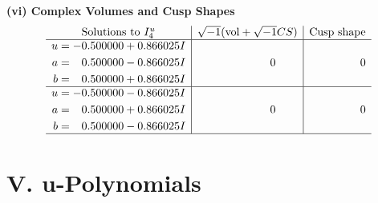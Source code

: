 \documentclass[1p]{elsarticle_modified}
\theoremstyle{definition}
\newcommand{\I}{\sqrt{-1}}
\begin{document}
\newpage\flushleft \textbf{(vi) Complex Volumes and Cusp Shapes}
$$\begin{array}{c|c|c}  
\text{Solutions to }I^u_{4}& \I (\text{vol} + \sqrt{-1}CS) & \text{Cusp shape}\\
 \hline 
\begin{aligned}
u &= -0.500000 + 0.866025 I \\
a &= \phantom{-}0.500000 - 0.866025 I \\
b &= \phantom{-}0.500000 + 0.866025 I\end{aligned}
 & \phantom{-0.000000 } 0 & \phantom{-0.000000 } 0 \\ \hline\begin{aligned}
u &= -0.500000 - 0.866025 I \\
a &= \phantom{-}0.500000 + 0.866025 I \\
b &= \phantom{-}0.500000 - 0.866025 I\end{aligned}
 & \phantom{-0.000000 } 0 & \phantom{-0.000000 } 0\\
 \hline 
 \end{array}$$\newpage
\newpage\renewcommand{\arraystretch}{1}
\centering \section*{ V. u-Polynomials}
\end{document}
